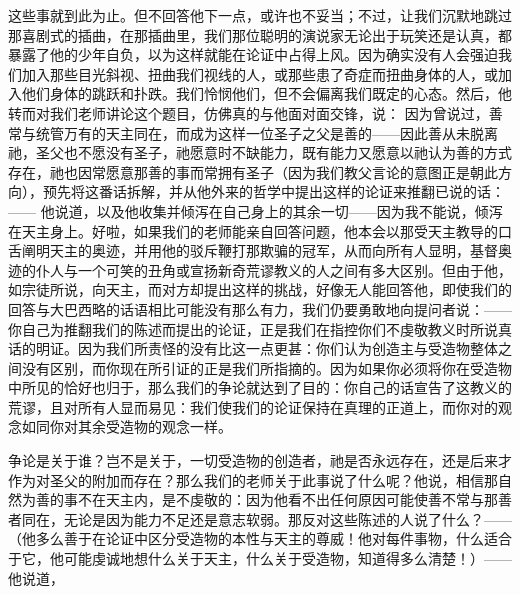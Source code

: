 这些事就到此为止。但不回答他下一点，或许也不妥当；不过，让我们沉默地跳过那喜剧式的插曲，在那插曲里，我们那位聪明的演说家无论出于玩笑还是认真，都暴露了他的少年自负，以为这样就能在论证中占得上风。因为确实没有人会强迫我们加入那些目光斜视、扭曲我们视线的人，或那些患了奇症而扭曲身体的人，或加入他们身体的跳跃和扑跌。我们怜悯他们，但不会偏离我们既定的心态。然后，他转而对我们老师讲论这个题目，仿佛真的与他面对面交锋，说： 因为曾说过，善常与统管万有的天主同在，而成为这样一位圣子之父是善的——因此善从未脱离祂，圣父也不愿没有圣子，祂愿意时不缺能力，既有能力又愿意以祂认为善的方式存在，祂也因常愿意那善的事而常拥有圣子（因为我们教父言论的意图正是朝此方向），预先将这番话拆解，并从他外来的哲学中提出这样的论证来推翻已说的话：—— 他说道，以及他收集并倾泻在自己身上的其余一切——因为我不能说，倾泻在天主身上。好啦，如果我们的老师能亲自回答问题，他本会以那受天主教导的口舌阐明天主的奥迹，并用他的驳斥鞭打那欺骗的冠军，从而向所有人显明，基督奥迹的仆人与一个可笑的丑角或宣扬新奇荒谬教义的人之间有多大区别。但由于他，如宗徒所说，向天主，而对方却提出这样的挑战，好像无人能回答他，即使我们的回答与大巴西略的话语相比可能没有那么有力，我们仍要勇敢地向提问者说：—— 你自己为推翻我们的陈述而提出的论证，正是我们在指控你们不虔敬教义时所说真话的明证。因为我们所责怪的没有比这一点更甚：你们认为创造主与受造物整体之间没有区别，而你现在所引证的正是我们所指摘的。因为如果你必须将你在受造物中所见的恰好也归于，那么我们的争论就达到了目的：你自己的话宣告了这教义的荒谬，且对所有人显而易见：我们使我们的论证保持在真理的正道上，而你对的观念如同你对其余受造物的观念一样。\par

争论是关于谁？岂不是关于，一切受造物的创造者，祂是否永远存在，还是后来才作为对圣父的附加而存在？那么我们的老师关于此事说了什么呢？他说，相信那自然为善的事不在天主内，是不虔敬的：因为他看不出任何原因可能使善不常与那善者同在，无论是因为能力不足还是意志软弱。那反对这些陈述的人说了什么？——（他多么善于在论证中区分受造物的本性与天主的尊威！他对每件事物，什么适合于它，他可能虔诚地想什么关于天主，什么关于受造物，知道得多么清楚！）—— 他说道，\par

